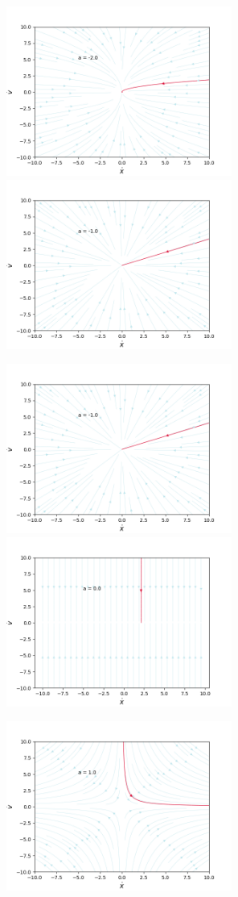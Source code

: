 \documentclass[12pt,fleqn]{article}\usepackage{../../common}
\begin{document}
\includegraphics[width=20em]{05_22.png}
\includegraphics[width=20em]{05_23.png}

\includegraphics[width=20em]{05_23.png}
\includegraphics[width=20em]{05_25.png}

\includegraphics[width=20em]{05_26.png}
\end{document}
